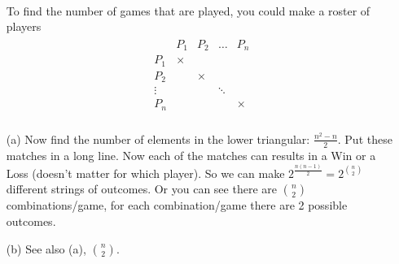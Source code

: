 

\setcounter{theorem}{3}
\begin{exercise}[BH.1.4]
\begin{solution}~
	\begin{enumerate}
		\item[] To find the number of games that are played, you could make a roster of players
		\begin{align*}
			\begin{array}{ccccc}
				&P_{1} & P_{2} &\ldots &P_{n}\\
				P_{1} & \times \\
				P_{2} & & \times \\
				\vdots&&&\ddots\\
				P_{n} & & & &\times\\
				\end{array}
		\end{align*}
		\item[(a)] Now find the number of elements in the lower triangular: $\frac{n^2-n}{2}$. Put these matches in a long line. Now each of the matches can results in a Win or a Loss (doesn't matter for which player). So we can make $2^{\frac{n(n-1)}{2}}=2^{n\choose 2 }$ different strings of outcomes. Or you can see there are $n\choose 2$ combinations/game, for each combination/game there are 2 possible outcomes. 
	\item[(b)] See also (a), $n\choose 2$.
	\end{enumerate}
\end{solution}
\end{exercise}

